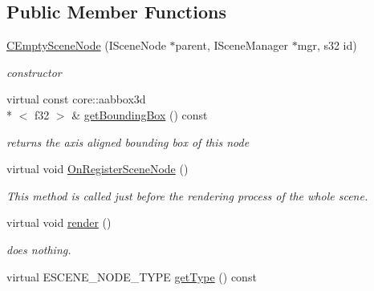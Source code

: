 \subsection*{Public Member Functions}
\begin{DoxyCompactItemize}
\item 
\hypertarget{classirr_1_1scene_1_1_c_empty_scene_node_aae743e6506023fef60bfe2e6684495bd}{\hyperlink{classirr_1_1scene_1_1_c_empty_scene_node_aae743e6506023fef60bfe2e6684495bd}{C\-Empty\-Scene\-Node} (I\-Scene\-Node $\ast$parent, I\-Scene\-Manager $\ast$mgr, s32 id)}\label{classirr_1_1scene_1_1_c_empty_scene_node_aae743e6506023fef60bfe2e6684495bd}

\begin{DoxyCompactList}\small\item\em constructor \end{DoxyCompactList}\item 
\hypertarget{classirr_1_1scene_1_1_c_empty_scene_node_a3bba11a59badb2c2c7bb9bfb3d776780}{virtual const core\-::aabbox3d\\*
$<$ f32 $>$ \& \hyperlink{classirr_1_1scene_1_1_c_empty_scene_node_a3bba11a59badb2c2c7bb9bfb3d776780}{get\-Bounding\-Box} () const }\label{classirr_1_1scene_1_1_c_empty_scene_node_a3bba11a59badb2c2c7bb9bfb3d776780}

\begin{DoxyCompactList}\small\item\em returns the axis aligned bounding box of this node \end{DoxyCompactList}\item 
virtual void \hyperlink{classirr_1_1scene_1_1_c_empty_scene_node_a9838b32f68a18df7c78fa205d7516aa1}{On\-Register\-Scene\-Node} ()
\begin{DoxyCompactList}\small\item\em This method is called just before the rendering process of the whole scene. \end{DoxyCompactList}\item 
virtual void \hyperlink{classirr_1_1scene_1_1_c_empty_scene_node_ac0f14efff09a9b394603c9dfa4a56384}{render} ()
\begin{DoxyCompactList}\small\item\em does nothing. \end{DoxyCompactList}\item 
\hypertarget{classirr_1_1scene_1_1_c_empty_scene_node_a9b0ecfe78d1c84e6465c573e05bc2a12}{virtual E\-S\-C\-E\-N\-E\-\_\-\-N\-O\-D\-E\-\_\-\-T\-Y\-P\-E \hyperlink{classirr_1_1scene_1_1_c_empty_scene_node_a9b0ecfe78d1c84e6465c573e05bc2a12}{get\-Type} () const }\label{classirr_1_1scene_1_1_c_empty_scene_node_a9b0ecfe78d1c84e6465c573e05bc2a12}


\end{DoxyCompactItemize}
